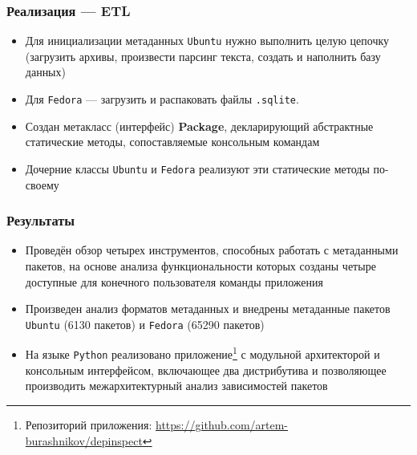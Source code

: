 \documentclass{beamer}
\begin{document}


\begin{frame}[t]
	\frametitle{Реализация --- ETL}
	\begin{itemize}
		\item Для инициализации метаданных \texttt{Ubuntu} нужно выполнить целую цепочку (загрузить архивы, произвести парсинг текста, создать и наполнить базу данных)
		\item Для \texttt{Fedora} --- загрузить и распаковать файлы \texttt{.sqlite}.
	\end{itemize}

	\begin{itemize}
		\item Создан метакласс (интерфейс) \textbf{Package}, декларирующий абстрактные статические методы, сопоставляемые консольным командам
		\item Дочерние классы \texttt{Ubuntu} и \texttt{Fedora} реализуют эти статические методы по-своему
	\end{itemize}
\end{frame}

\begin{frame}
	\frametitle{Результаты}
	\begin{itemize}
		\item Проведён обзор четырех инструментов, способных работать с метаданными пакетов, на основе анализа функциональности которых созданы четыре доступные для конечного пользователя команды приложения
		\item Произведен анализ форматов метаданных и внедрены метаданные пакетов \texttt{Ubuntu} (6130 пакетов) и \texttt{Fedora} (65290 пакетов)
		\item На языке \texttt{Python} реализовано приложение\footnote{Репозиторий приложения: \href{https://github.com/artem-burashnikov/depinspect}{https://github.com/artem-burashnikov/depinspect}} с модульной архитекторой и консольным интерфейсом, включающее два дистрибутива и позволяющее производить межархитектурный анализ зависимостей пакетов
	\end{itemize}
\end{frame}


% 		
\end{document}
